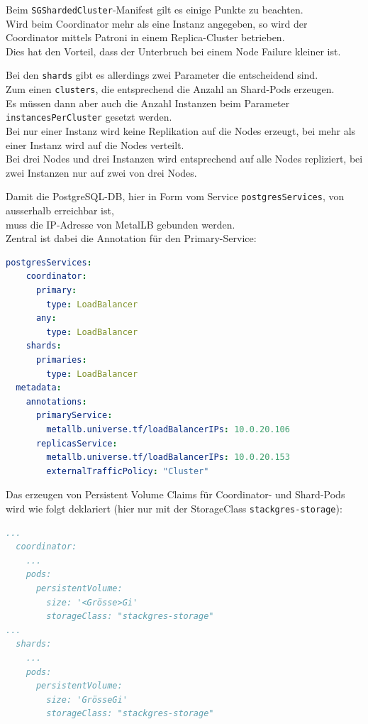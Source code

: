 \begin{flushleft}
    Beim \texttt{SGShardedCluster}-Manifest gilt es einige Punkte zu beachten.\\
    Wird beim Coordinator mehr als eine Instanz angegeben, so wird der Coordinator mittels Patroni in einem Replica-Cluster betrieben.\\Dies hat den Vorteil, dass der Unterbruch bei einem Node Failure kleiner ist.
\end{flushleft}
\begin{flushleft}
    Bei den \texttt{shards} gibt es allerdings zwei Parameter die entscheidend sind.\\Zum einen \texttt{clusters}, die entsprechend die Anzahl an Shard-Pods erzeugen.\\
    Es müssen dann aber auch die Anzahl Instanzen beim Parameter \texttt{instancesPerCluster} gesetzt werden.\\Bei nur einer Instanz wird keine Replikation auf die Nodes erzeugt, bei mehr als einer Instanz wird auf die Nodes verteilt.\\
    Bei drei Nodes und drei Instanzen wird entsprechend auf alle Nodes repliziert, bei zwei Instanzen nur auf zwei von drei Nodes.
\end{flushleft}
\begin{flushleft}
    Damit die PostgreSQL-DB, hier in Form vom Service \texttt{postgresServices}, von ausserhalb erreichbar ist,\\muss die IP-Adresse von \Gls{MetalLB} gebunden werden.\\
    Zentral ist dabei die Annotation für den Primary-Service:
\lstset{style=gra_codestyle}
\begin{lstlisting}[language=yaml, caption=StackGres-Citus - LoadBalancer -Annotation,captionpos=b,label={lst:stackgres-citus-loadbalancer-annotation},breaklines=true]
  postgresServices:
    coordinator:
      primary:
        type: LoadBalancer
      any:
        type: LoadBalancer
    shards:
      primaries:
        type: LoadBalancer
  metadata:
    annotations:
      primaryService:
        metallb.universe.tf/loadBalancerIPs: 10.0.20.106
      replicasService:
        metallb.universe.tf/loadBalancerIPs: 10.0.20.153
        externalTrafficPolicy: "Cluster"
\end{lstlisting}
\end{flushleft}
\begin{flushleft}
    Das erzeugen von Persistent Volume Claims für Coordinator- und Shard-Pods wird wie folgt deklariert (hier nur mit der StorageClass \texttt{stackgres-storage}):
\lstset{style=gra_codestyle}
\begin{lstlisting}[language=yaml, caption=StackGres-Citus - StorageClass -PVC Binding,captionpos=b,label={lst:stackgres-citus-storageclass-pvc},breaklines=true]
...
  coordinator:
    ...
    pods:
      persistentVolume:
        size: '<Grösse>Gi'
        storageClass: "stackgres-storage"
...
  shards:
    ...
    pods:
      persistentVolume:
        size: 'GrösseGi'
        storageClass: "stackgres-storage"
\end{lstlisting}
\end{flushleft}

